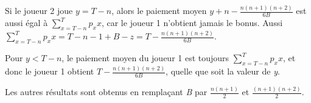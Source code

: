 \begin{Article}
\begin{refsection}[UmbhauerFR]
\begin{appendices}
Si le joueur 2 joue \(y = T - n\), alors le paiement moyen
\(y + n - \frac{n(n + 1)(n + 2)}{6B}\) est aussi égal à
\(\sum_{x = T - n}^{T}{p_{x}x}\), car le joueur 1 n'obtient jamais le
bonus. Aussi
\(\sum_{x = T - n}^{T}{p_{x}x} = T - n - 1 + B - z = T - \frac{n(n + 1)(n + 2)}{6B}\).

Pour \(y < T - n\), le paiement moyen du joueur 1 est toujours
\(\sum_{x = T - n}^{T}{p_{x}x}\), et donc le joueur 1 obtient
\(T - \frac{n(n + 1)(n + 2)}{6B}\), quelle que soit la valeur de
\emph{y}.

Les autres résultats sont obtenus en remplaçant \emph{B} par
\(\frac{n(n + 1)}{2}\) et \(\frac{(n + 1)(n + 2)}{2}\).
\end{appendices}

\end{refsection}

\end{Article}
